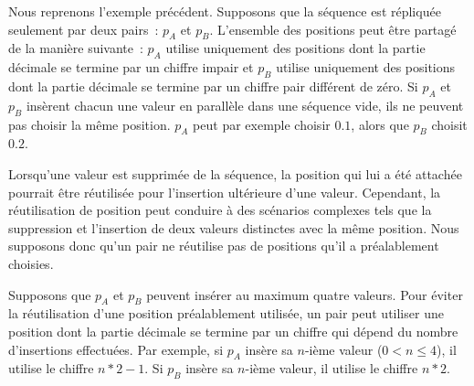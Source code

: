 \medskip

Nous reprenons l'exemple précédent.
Supposons que la séquence est répliquée seulement par deux pairs~: $p_A$ et $p_B$.
L'ensemble des positions peut être partagé de la manière suivante~: $p_A$ utilise uniquement des positions dont la partie décimale se termine par un chiffre impair et $p_B$ utilise uniquement des positions dont la partie décimale se termine par un chiffre pair différent de zéro.
Si $p_A$ et $p_B$ insèrent chacun une valeur en parallèle dans une séquence vide, ils ne peuvent pas choisir la même position.
$p_A$ peut par exemple choisir $0.1$, alors que $p_B$ choisit $0.2$.


\medskip

Lorsqu'une valeur est supprimée de la séquence, la position qui lui a été attachée pourrait être réutilisée pour l'insertion ultérieure d'une valeur.
Cependant, la réutilisation de position peut conduire à des scénarios complexes tels que la suppression et l'insertion de deux valeurs distinctes avec la même position.
Nous supposons donc qu'un pair ne réutilise pas de positions qu'il a préalablement choisies.

\medskip

Supposons que $p_A$ et $p_B$ peuvent insérer au maximum quatre valeurs.
Pour éviter la réutilisation d'une position préalablement utilisée, un pair peut utiliser une position dont la partie décimale se termine par un chiffre qui dépend du nombre d'insertions effectuées.
Par exemple, si $p_A$ insère sa $n$-ième valeur ($0 < n \leq 4$), il utilise le chiffre $n*2-1$.
Si $p_B$ insère sa $n$-ième valeur, il utilise le chiffre $n*2$.


